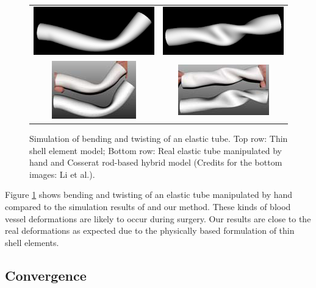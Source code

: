 \begin{figure}[tbh]
    \centering
    \begin{tabular}{cc}
     \includegraphics[width=0.3\columnwidth]{img/compare-bend.png}
      &
      \includegraphics[width=0.3\columnwidth]{img/compare-twist.png}
      \\
      \includegraphics[width=0.3\columnwidth]{img/compare-bend-other.png}
      &
      \includegraphics[width=0.3\columnwidth]{img/compare-twist-other.png}
    \end{tabular}
    \caption{Simulation of bending and twisting of an elastic tube. Top row: Thin shell element model; Bottom row: Real elastic tube manipulated by hand and Cosserat rod-based hybrid model \cite{Li2009} (Credits for the bottom images: Li et al.).}
    \label{fig-deformations}
\end{figure}

Figure \ref{fig-deformations} shows bending and twisting of an elastic tube manipulated by hand compared to the simulation results of \cite{Li2009} and our method. These kinds of blood vessel deformations are likely to occur during surgery. Our results are close to the real deformations as expected due to the physically based formulation of thin shell elements.

\subsection{Convergence}

